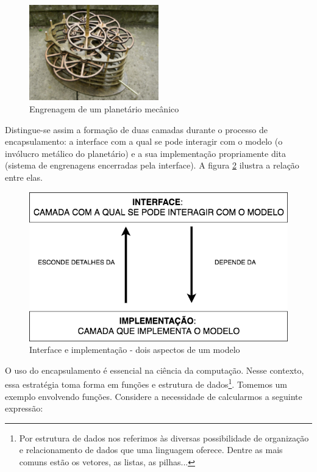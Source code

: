 \begin{figure}[!htb]
	\caption{Engrenagem de um planetário mecânico}\label{fig:engine}
	\begin{center}
		\includegraphics[width=0.50\textwidth]{imagens/engine}
	\end{center}
\end{figure}

Distingue-se assim a formação de duas camadas durante o processo de encapsulamento: a interface com a qual se pode interagir com o modelo (o invólucro metálico do planetário) e a sua implementação propriamente dita (sistema de engrenagens encerradas pela interface). A figura \ref{fig:encapsulamento} ilustra a relação entre elas.

\begin{figure}[!htb]
	\caption{Interface e implementação - dois aspectos de um modelo}\label{fig:encapsulamento}
	\begin{center}
		\includegraphics[scale=0.55]{imagens/encapsulamento}
	\end{center}
\end{figure}

O uso do encapsulamento é essencial na ciência da computação. Nesse contexto, essa estratégia toma forma em funções e estrutura de dados\footnote{Por estrutura de dados nos referimos às diversas possibilidade de organização e relacionamento de dados que uma linguagem oferece. Dentre as mais comuns estão os vetores, as listas, as pilhas...}. Tomemos um exemplo envolvendo funções. Considere a necessidade de calcularmos a seguinte expressão: 

